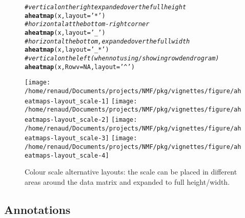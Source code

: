 \documentclass[a4paper]{article}\usepackage[]{graphicx}\usepackage[]{color}
\makeatletter
\newcommand{\hlnum}[1]{\textcolor[rgb]{0.686,0.059,0.569}{#1}}%
\newcommand{\hlstr}[1]{\textcolor[rgb]{0.192,0.494,0.8}{#1}}%
\newcommand{\hlcom}[1]{\textcolor[rgb]{0.678,0.584,0.686}{\textit{#1}}}%
\newcommand{\hlstd}[1]{\textcolor[rgb]{0.345,0.345,0.345}{#1}}%
\newcommand{\hlkwc}[1]{\textcolor[rgb]{0.333,0.667,0.333}{#1}}%
\newcommand{\hlkwd}[1]{\textcolor[rgb]{0.737,0.353,0.396}{\textbf{#1}}}%
\newenvironment{kframe}{%
 \def\at@end@of@kframe{}%
 \ifinner\ifhmode%
  \def\at@end@of@kframe{\end{minipage}}%
  \begin{minipage}{\columnwidth}%
 \fi\fi%
 \def\FrameCommand##1{\hskip\@totalleftmargin \hskip-\fboxsep
 \colorbox{shadecolor}{##1}\hskip-\fboxsep
     \hskip-\linewidth \hskip-\@totalleftmargin \hskip\columnwidth}%
 \MakeFramed {\advance\hsize-\width
   \@totalleftmargin\z@ \linewidth\hsize
   \@setminipage}}%
 {\par\unskip\endMakeFramed%
 \at@end@of@kframe}
\newenvironment{knitrout}{}{} %
\makeatother
\begin{document}
\begin{figure}[h!]
\begin{knitrout}\small
{}\color{fgcolor}\begin{kframe}
\begin{alltt}
\hlcom{# vertical on the right expanded over the full height}
\hlkwd{aheatmap}\hlstd{(x,} \hlkwc{layout} \hlstd{=} \hlstr{'*'}\hlstd{)}
\hlcom{# horizontal at the bottom-right corner}
\hlkwd{aheatmap}\hlstd{(x,} \hlkwc{layout} \hlstd{=} \hlstr{'_'}\hlstd{)}
\hlcom{# horizontal the bottom, expanded over the full width}
\hlkwd{aheatmap}\hlstd{(x,} \hlkwc{layout} \hlstd{=} \hlstr{'_*'}\hlstd{)}
\hlcom{# vertical on the left (when not using/showing row dendrogram)}
\hlkwd{aheatmap}\hlstd{(x,} \hlkwc{Rowv} \hlstd{=} \hlnum{NA}\hlstd{,} \hlkwc{layout} \hlstd{=} \hlstr{'^'}\hlstd{)}
\end{alltt}
\end{kframe}
\texttt{[image: /home/renaud/Documents/projects/NMF/pkg/vignettes/figure/aheatmaps-layout\_scale-1]} 
\texttt{[image: /home/renaud/Documents/projects/NMF/pkg/vignettes/figure/aheatmaps-layout\_scale-2]} 
\texttt{[image: /home/renaud/Documents/projects/NMF/pkg/vignettes/figure/aheatmaps-layout\_scale-3]} 
\texttt{[image: /home/renaud/Documents/projects/NMF/pkg/vignettes/figure/aheatmaps-layout\_scale-4]} 

\end{knitrout}
\caption{Colour scale alternative layouts: the scale can be placed in different
areas around the data matrix and expanded to full height/width.}
\label{fig:layout_scale}
\end{figure}


\subsection{Annotations}
\end{document}
